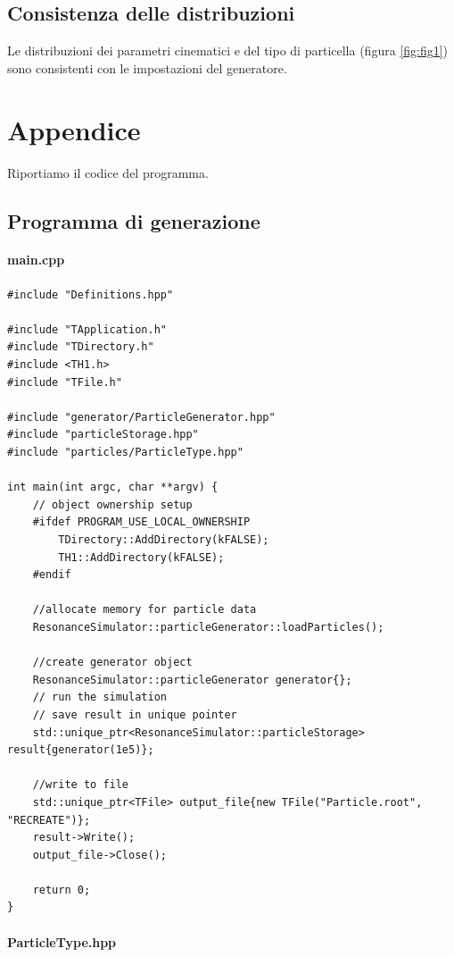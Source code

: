 \documentclass[12pt, a4paper]{article}
\begin{document}
\subsection{Consistenza delle distribuzioni}
Le distribuzioni dei parametri cinematici e del tipo di particella (figura \ref{fig:fig1}) sono consistenti con le impostazioni del generatore.


\section{Appendice}

Riportiamo il codice del programma.

\subsection{Programma di generazione}

\paragraph{main.cpp}

\begin{verbatim}
#include "Definitions.hpp"

#include "TApplication.h"
#include "TDirectory.h"
#include <TH1.h>
#include "TFile.h"

#include "generator/ParticleGenerator.hpp"
#include "particleStorage.hpp"
#include "particles/ParticleType.hpp"

int main(int argc, char **argv) {
    // object ownership setup
    #ifdef PROGRAM_USE_LOCAL_OWNERSHIP
        TDirectory::AddDirectory(kFALSE);
        TH1::AddDirectory(kFALSE);
    #endif

    //allocate memory for particle data
    ResonanceSimulator::particleGenerator::loadParticles();

    //create generator object
    ResonanceSimulator::particleGenerator generator{};
    // run the simulation
    // save result in unique pointer
    std::unique_ptr<ResonanceSimulator::particleStorage> result{generator(1e5)};

    //write to file
    std::unique_ptr<TFile> output_file{new TFile("Particle.root", "RECREATE")};
    result->Write();
    output_file->Close();

    return 0;
}
\end{verbatim}

\paragraph{ParticleType.hpp}
\end{document}
